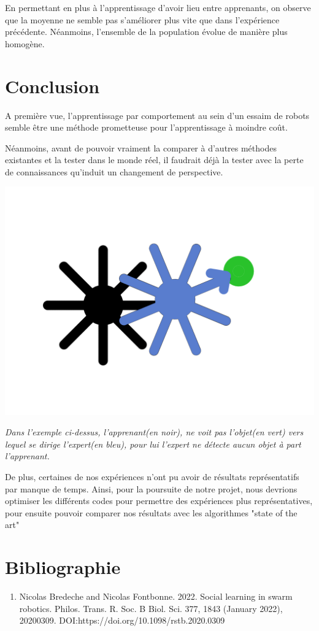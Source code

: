 \documentclass[a4paper, 12pt]{report}
\begin{document}
	En permettant en plus à l'apprentissage d'avoir lieu entre apprenants, on observe que la moyenne ne semble pas s'améliorer plus vite que dans l'expérience précédente. Néanmoins, l'ensemble de la population évolue de manière plus homogène.


\chapter{Conclusion}

A première vue, l'apprentissage par comportement au sein d'un essaim de robots semble être une méthode prometteuse pour l'apprentissage à moindre coût.

Néanmoins, avant de pouvoir vraiment la comparer à d'autres méthodes existantes et la tester dans le monde réel, il faudrait déjà la tester avec la perte de connaissances qu'induit un changement de perspective.
\begin{center}
	\includegraphics[scale = 0.5]{scheme.png}
\end{center}
\textit{Dans l'exemple ci-dessus, l'apprenant(en noir), ne voit pas l'objet(en vert) vers lequel se dirige l'expert(en bleu), pour lui l'expert ne détecte aucun objet à part l'apprenant.}

De plus, certaines de nos expériences n'ont pu avoir de résultats représentatifs par manque de temps. Ainsi, pour la poursuite de notre projet, nous devrions optimiser les différents codes pour permettre des expériences plus représentatives, pour ensuite pouvoir comparer nos résultats avec les algorithmes "state of the art"

    \appendix
    \chapter{Bibliographie}
    \begin{enumerate}
	\item {Nicolas Bredeche and Nicolas Fontbonne. 2022. Social learning in swarm robotics. Philos. Trans. R. Soc. B Biol. Sci. 377, 1843 (January 2022), 20200309. DOI:https://doi.org/10.1098/rstb.2020.0309}
    \end{enumerate}
\end{document}
